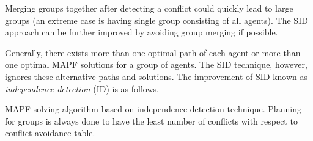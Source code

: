 \documentclass[jair,oneside,11pt]{article}
\begin{document}
Merging groups together after detecting a conflict could quickly lead to large groups (an extreme case is having single group consisting of all agents). The SID approach can be further improved by avoiding group merging if possible.

Generally, there exists more than one optimal path of each agent or more than one optimal MAPF solutions for a group of agents. The SID technique, however, ignores these alternative paths and solutions. The improvement of SID known as {\em independence detection} (ID) is as follows.

\begin{algorithm}[h]
\begin{footnotesize}
 
\caption{MAPF solving algorithm based on independence detection technique. Planning for groups is always done to have the least number of conflicts with respect to conflict avoidance table.}
\label{alg-A-ID}
\end{footnotesize}
\end{algorithm}
\end{document}
